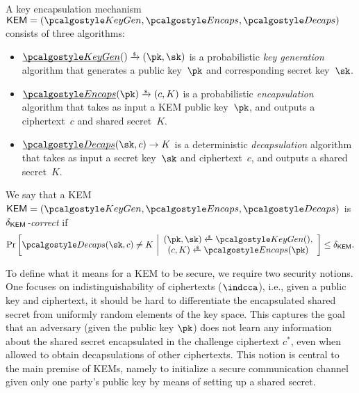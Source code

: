 \begin{definition}
    \label{def:kem}
    A key encapsulation mechanism $\KEM = (\kgen, \encaps, \decaps)$ consists of three algorithms:
    \begin{itemize}
        \item $\ul{\kgen}() \tor (\pk, \sk)$
        is a probabilistic \emph{key generation} algorithm that generates a public key~$\pk$ and corresponding secret key~$\sk$.
        \item $\ul{\encaps}(\pk) \tor (c, K)$
        is a probabilistic \emph{encapsulation} algorithm that takes as input a KEM public key~$\pk$, and outputs a ciphertext~$c$ and shared secret~$K$.
        \item $\ul{\decaps}(\sk, c) \to K$
        is a deterministic \emph{decapsulation} algorithm that takes as input a secret key~$\sk$ and ciphertext~$c$, and outputs a shared secret~$K$.
    \end{itemize}
\end{definition}

\begin{definition}
\label{def:kem-corr}
We say that a KEM~$\KEM=(\kgen, \encaps, \decaps)$ is \emph{$\delta_{\mathsf{KEM}}$-correct} if
\[
    \Pr\left[
        \decaps(\sk,c) \neq K
    ~\middle|
        \begin{array}{c}
        (\pk,\sk) \getsr \kgen(), \\
        (c, K) \getsr \encaps(\pk)
        \end{array}
    \right] \leq \delta_\KEM.
\]
\end{definition}

To define what it means for a KEM to be secure, we require two security notions. One focuses on indistinguishability of ciphertexts ($\indcca$), i.e., given a public key and ciphertext, it should be hard to differentiate the encapsulated shared secret from uniformly random elements of the key space.
This captures the goal that an adversary (given the public key $\pk$) does not learn any information about the shared secret encapsulated in the challenge ciphertext $c^*$, even when allowed to obtain decapsulations of other ciphertexts.
This notion is central to the main premise of KEMs, namely to initialize a secure communication channel given only one party's public key by means of setting up a shared secret.

